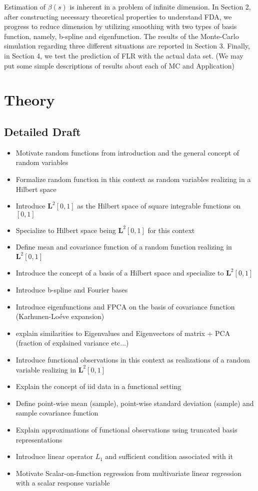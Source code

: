 \documentclass[11pt,twoside,a4paper]{article}
\begin{document}
	 Estimation of $\beta(s)$ is inherent in a problem of infinite dimension. In Section 2, after constructing necessary theoretical properties to understand FDA, we progress to reduce dimension by utilizing smoothing with two types of basis function, namely, b-spline and eigenfunction. The results of the Monte-Carlo simulation regarding three different situations are reported in Section 3. Finally, in Section 4, we test the prediction of FLR with the actual data set. {\color{red} (We may put some simple descriptions of results about each of MC and Application)}

	\section{Theory}
	
	\subsection{Detailed Draft}
	\begin{itemize}
		\item Motivate random functions from introduction and the general concept of random variables
		\item Formalize random function in this context as random variables realizing in a Hilbert space
		\item Introduce $\mathbf{L}^2[0,1]$ as the Hilbert space of square integrable functions on $[0,1]$
		\item Specialize to Hilbert space being $\mathbf{L}^2[0,1]$ for this context
		\item Define mean and covariance function of a random function realizing in $\mathbf{L}^2[0,1]$
		\item Introduce the concept of a basis of a Hilbert space and specialize to $\mathbf{L}^2[0,1]$
		\item Introduce b-spline and Fourier bases
		\item Introduce eigenfunctions and FPCA on the basis of covariance function (Karhunen-Lo\'{e}ve expansion)
		\item explain similarities to Eigenvalues and Eigenvectors of matrix + PCA (fraction of explained variance etc...)
		\item Introduce functional observations in this context as realizations of a random variable realizing in $\mathbf{L}^2[0,1]$
		\item Explain the concept of iid data in a functional setting
		\item Define point-wise mean (sample), point-wise standard deviation (sample) and sample covariance function
		\item Explain approximations of functional observations using truncated basis representations
		\item Introduce linear operator $L_1$ and sufficient condition associated with it
		\item Motivate Scalar-on-function regression from multivariate linear regression with a scalar response variable
	\end{itemize}
\end{document}
